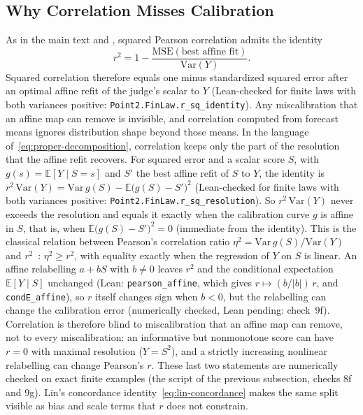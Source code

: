 \subsection{Why Correlation Misses Calibration}
As in the main text and , squared Pearson correlation admits the identity
\begin{equation}
\label{eq:r-squared-cal}
r^2
=
1
-
\frac{\mathrm{MSE}(\text{best affine fit})}{\mathrm{Var}(Y)}.
\end{equation}
Squared correlation therefore equals one minus standardized squared error after an optimal affine refit of the judge's scalar to $Y$ (Lean-checked for finite laws with both variances positive: \texttt{Point2.FinLaw.r\_\allowbreak sq\_\allowbreak identity}).
Any miscalibration that an affine map can remove is invisible, and correlation computed from forecast means ignores distribution shape beyond those means.
In the language of~\eqref{eq:proper-decomposition}, correlation keeps only the part of the resolution that the affine refit recovers.
For squared error and a scalar score $S$, with $g(s)=\mathbb{E}[Y\mid S=s]$ and $S'$ the best affine refit of $S$ to $Y$, the identity is $r^2\,\mathrm{Var}(Y)=\mathrm{Var}\,g(S)-\mathbb{E}\bigl(g(S)-S'\bigr)^2$ (Lean-checked for finite laws with both variances positive: \texttt{Point2.FinLaw.r\_\allowbreak sq\_\allowbreak resolution}).
So $r^2\,\mathrm{Var}(Y)$ never exceeds the resolution and equals it exactly when the calibration curve $g$ is affine in $S$, that is, when $\mathbb{E}\bigl(g(S)-S'\bigr)^2=0$ (immediate from the identity).
This is the classical relation between Pearson's correlation ratio $\eta^2=\mathrm{Var}\,g(S)/\mathrm{Var}(Y)$ and $r^2$~\citep{pearson1905skew}: $\eta^2\ge r^2$, with equality exactly when the regression of $Y$ on $S$ is linear.
An affine relabelling $a+bS$ with $b\neq0$ leaves $r^2$ and the conditional expectation $\mathbb{E}[Y\mid S]$ unchanged (Lean: \texttt{pearson\_\allowbreak affine}, which gives $r\mapsto(b/|b|)\,r$, and \texttt{condE\_\allowbreak affine}), so $r$ itself changes sign when $b<0$, but the relabelling can change the calibration error (numerically checked, Lean pending: check~9f).
Correlation is therefore blind to miscalibration that an affine map can remove, not to every miscalibration: an informative but nonmonotone score can have $r=0$ with maximal resolution ($Y=S^2$), and a strictly increasing nonlinear relabelling can change Pearson's $r$.
These last two statements are numerically checked on exact finite examples (the script of the previous subsection, checks 8f and 9g).
Lin's concordance identity~\eqref{eq:lin-concordance} makes the same split visible as bias and scale terms that $r$ does not constrain.

